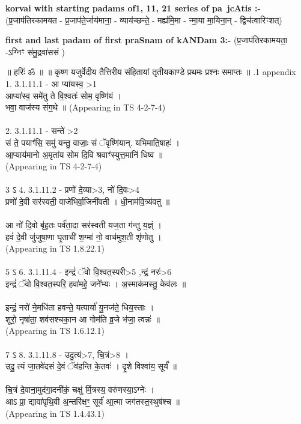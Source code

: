 \documentclass[17pt]{extarticle}
\begin{document}
\textbf{korvai with starting padams of1, 11, 21 series of pa~jcAtis :-} \newline
(प्र॒जाप॑तिरकामयत - प्र॒जाप॑ते॒र्जाय॑माना॒ - व्याय॑च्छन्ते॒ - मह्य॑मि॒मा - न्मा॒या मा॒यिना॒न् - द्विच॑त्वारिꣳशत्) \newline

\textbf{first and last padam of first praSnam of kANDam 3:-} \newline
(प्र॒जाप॑तिरकामयता॒ -ऽग्निꣳ स॑मु॒द्रवा॑ससं ) \newline 


॥ हरिः॑ ॐ ॥
॥ कृष्ण यजुर्वेदीय तैत्तिरीय संहितायां तृतीयकाण्डे प्रथमः प्रश्नः समाप्तः ॥ \newline
{}.1   appendix\\1.      3.1.11.1 - आ प्या॑यस्व॒ >1\\आप्या॑स्व॒ समे॑तु ते वि॒श्वतः॑ सोम॒ वृष्णि॑यं ।\\भवा॒ वाज॑स्य संग॒थे ॥ (Appearing in TS 4-2-7-4)\\\\2.      3.1.11.1 - सन्ते॑ >2\\सं ते॒ पयाꣳ॑सि॒ समु॑ यन्तु॒ वाजाः॒ सं ॅवृष्णि॑यान्. यभिमाति॒षाहः॑ ।\\आ॒प्याय॑मानो अ॒मृता॑य सोम दि॒वि श्रवाꣳ॑स्युत्त॒मानि॑ धिष्व ॥ \\(Appearing in TS 4-2-7-4)\\\\3 ऽ 4. 3.1.11.2 - प्रणो॑ दे॒व्या>3, नो॑ दि॒वः>4\\प्रणो॑ दे॒वी सर॑स्वती॒ वाजे॑भिर्वा॒जिनी॑वती । धी॒नाम॑वि॒त्र्य॑वतु ॥\\\\आ नो॑ दि॒वो बृ॑ह॒तः पर्व॑ता॒दा सर॑स्वती यज॒ता ग॑न्तु य॒ज्ञ्ं । \\हवं॑ दे॒वी जु॑जुषा॒णा घृ॒ताची॑ श॒ग्मां नो॒ वाच॑मुश॒ती शृ॑णोतु ।\\(Appearing in TS 1.8.22.1)\\\\5 ऽ 6. 3.1.11.4 - इन्द्रं॑ ॅवो वि॒श्वत॒स्परी>5 ,न्द्रं॒ नरः॑>6\\इन्द्रं॑ ॅवो वि॒श्वत॒स्परि॒ हवा॑महे॒ जने᳚भ्यः । अ॒स्माक॑मस्तु॒ केव॑लः ॥ \\\\इन्द्रं॒ नरो॑ ने॒मधि॑ता हवन्ते॒ यत्पार्या॑ यु॒नज॑ते॒ धिय॒स्ताः ।\\शूरो॒ नृषा॑ता॒ शव॑सश्चका॒न आ गोम॑ति व्र॒जे भ॑जा॒ त्वन्नः॑ ॥\\(Appearing in TS 1.6.12.1)\\\\7 ऽ 8. 3.1.11.8 - उदु॒त्यं>7, चि॒त्रं>8 ।\\उदु॒ त्यं जा॒तवे॑दसं दे॒वं ॅव॑हन्ति के॒तवः॑ । दृ॒शे विश्वा॑य॒ सूर्यं᳚ ॥\\\\चि॒त्रं दे॒वाना॒मुद॑गा॒दनी॑कं॒ चक्षु॑ र्मि॒त्रस्य॒ वरु॑णस्या॒ऽग्नेः ।\\आऽ प्रा॒ द्यावा॑पृथि॒वी अ॒न्तरि॑क्षꣳ॒॒ सूर्य॑ आ॒त्मा जग॑तस्त॒स्थुष॑श्च ॥ \\(Appearing in TS 1.4.43.1)\\
\pagebreak
        
\end{document}
